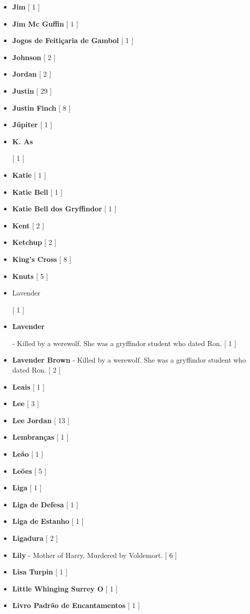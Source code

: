 \documentclass[a4paper]{article}
\begin{document}
\begin{itemize}
	\item \textbf{Jim} [ 1 ]
	\item \textbf{Jim Mc Guffin} [ 1 ]
	\item \textbf{Jogos de Feitiçaria de Gambol} [ 1 ]
	\item \textbf{Johnson} [ 2 ]
	\item \textbf{Jordan} [ 2 ]
	\item \textbf{Justin} [ 29 ]
	\item \textbf{Justin Finch} [ 8 ]
	\item \textbf{Júpiter} [ 1 ]
	\item \hypertarget{K}{\textbf{K. As}} [ 1 ]
	\item \textbf{Katie} [ 1 ]
	\item \textbf{Katie Bell} [ 1 ]
	\item \textbf{Katie Bell dos Gryffindor} [ 1 ]
	\item \textbf{Kent} [ 2 ]
	\item \textbf{Ketchup} [ 2 ]
	\item \textbf{King's Cross} [ 8 ]
	\item \textbf{Knuts} [ 5 ]
	\item \hypertarget{L}{Lavender} [ 1 ]
	\item \hypertarget{L}{\textbf{Lavender}} - Killed by a werewolf. She was a gryffindor student who dated Ron.  [ 1 ]
	\item \textbf{Lavender Brown} - Killed by a werewolf. She was a gryffindor student who dated Ron.  [ 2 ]
	\item \textbf{Leais} [ 1 ]
	\item \textbf{Lee} [ 3 ]
	\item \textbf{Lee Jordan} [ 13 ]
	\item \textbf{Lembranças} [ 1 ]
	\item \textbf{Leão} [ 1 ]
	\item \textbf{Leões} [ 5 ]
	\item \textbf{Liga} [ 1 ]
	\item \textbf{Liga de Defesa} [ 1 ]
	\item \textbf{Liga de Estanho} [ 1 ]
	\item \textbf{Ligadura} [ 2 ]
	\item \textbf{Lily} - Mother of Harry. Murdered by Voldemort. [ 6 ]
	\item \textbf{Lisa Turpin} [ 1 ]
	\item \textbf{Little Whinging Surrey O} [ 1 ]
	\item \textbf{Livro Padrão de Encantamentos} [ 1 ]

\end{itemize}
\end{document}
